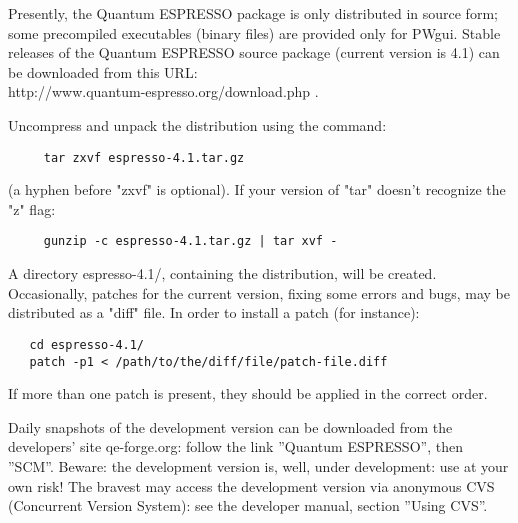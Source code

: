 \documentclass[12pt,a4paper]{article}
\def\version{4.1}
\begin{document}
Presently, the Quantum ESPRESSO package is only distributed in source form; 
some precompiled executables (binary files) are provided only for PWgui. 
Stable releases of the Quantum ESPRESSO source package (current version 
is \version) can be downloaded from this URL: \\
http://www.quantum-espresso.org/download.php .

Uncompress and unpack the distribution using the command:
\begin{verbatim}
     tar zxvf espresso-4.1.tar.gz
\end{verbatim}
(a hyphen before "zxvf" is optional). If your version of "tar" 
doesn't recognize the "z" flag:
\begin{verbatim}
     gunzip -c espresso-4.1.tar.gz | tar xvf -
\end{verbatim}
A directory espresso-\version/, containing the distribution, will be created. 
Occasionally, patches for the current version, fixing some errors and bugs,
may be distributed as a "diff" file. In order to install a patch (for instance):\begin{verbatim}
   cd espresso-4.1/
   patch -p1 < /path/to/the/diff/file/patch-file.diff
\end{verbatim}

If more than one patch is present, they should be applied in the correct order.

Daily snapshots of the development version can be downloaded from the
developers' site qe-forge.org: follow the link ''Quantum ESPRESSO'',
then ''SCM''. Beware: the development version is, well, under
development: use at your own risk! The bravest may access the 
development version via anonymous CVS 
(Concurrent Version System): see the developer manual, section
''Using CVS''.
\end{document}
